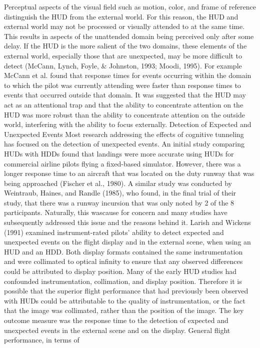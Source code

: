 \documentclass[utf8,bachelor,manualbib]{gradu3}
\begin{document}
Perceptual aspects of the visual field such as motion, color, and frame of reference
distinguish the HUD from the external world. For this reason, the HUD and
external world may not be processed or visually attended to at the same time. This
results in aspects of the unattended domain being perceived only after some delay.
If the HUD is the more salient of the two domains, these elements of the external
world, especially those that are unexpected, may be more difficult to detect
(McCann, Lynch, Foyle, \& Johnston, 1993; Moodi, 1995). For example McCann
et al. found that response times for events occurring within the domain to which
the pilot was currently attending were faster than response times to events that occurred
outside that domain. It was suggested that the HUD may act as an
attentional trap and that the ability to concentrate attention on the HUD was more
robust than the ability to concentrate attention on the outside world, interfering
with the ability to focus externally.
Detection of Expected and Unexpected Events
Most research addressing the effects of cognitive tunneling has focused on the
detection of unexpected events. An initial study comparing HUDs with HDDs
found that landings were more accurate using HUDs for commercial airline pilots
flying a fixed-based simulator. However, there was a longer response time
to an aircraft that was located on the duty runway that was being approached
(Fischer et al., 1980). A similar study was conducted by Weintraub, Haines, and
Randle (1985), who found, in the final trial of their study, that there was a runway
incursion that was only noted by 2 of the 8 participants. Naturally, this wascause for concern and many studies have subsequently addressed this issue and
the reasons behind it.
Larish and Wickens (1991) examined instrument-rated pilots’ ability to detect
expected and unexpected events on the flight display and in the external scene,
when using an HUD and an HDD. Both display formats contained the same instrumentation
and were collimated to optical infinity to ensure that any observed differences
could be attributed to display position. Many of the early HUD studies
had confounded instrumentation, collimation, and display position. Therefore it is
possible that the superior flight performance that had previously been observed
with HUDs could be attributable to the quality of instrumentation, or the fact that
the image was collimated, rather than the position of the image. The key outcome
measure was the response time to the detection of expected and unexpected events
in the external scene and on the display. General flight performance, in terms of
\end{document}
